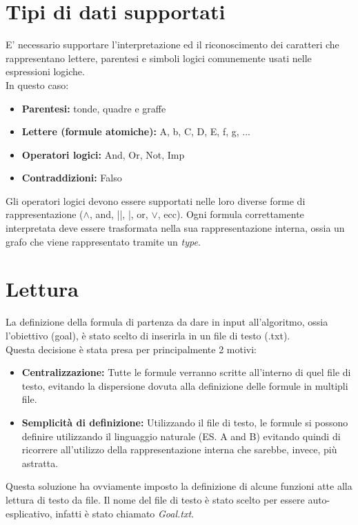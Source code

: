 \documentclass[\main/tesi.tex]{subfiles}
\begin{document}
\section{Tipi di dati supportati}
E' necessario supportare l'interpretazione ed il riconoscimento dei caratteri che rappresentano lettere, parentesi e simboli logici comunemente usati nelle espressioni logiche. \\
In questo caso:
\begin{itemize}
    \item \textbf{Parentesi:} tonde, quadre e graffe
    \item \textbf{Lettere (formule atomiche):} A, b, C, D, E, f, g, ...
    \item \textbf{Operatori logici:} And, Or, Not, Imp
    \item \textbf{Contraddizioni:} Falso
\end{itemize}
Gli operatori logici devono essere supportati nelle loro diverse forme di rappresentazione (\(\land\), and, ||, |, or, \(\lor\), ecc).
Ogni formula correttamente interpretata deve essere trasformata nella sua rappresentazione interna, ossia un grafo che viene rappresentato tramite un \textit{type}. \\

\section{Lettura}
La definizione della formula di partenza da dare in input all'algoritmo, ossia l'obiettivo (goal), è stato scelto di inserirla in un file di testo (.txt). \\
Questa decisione è stata presa per principalmente 2 motivi:
\begin{itemize}
    \item \textbf{Centralizzazione:} Tutte le formule verranno scritte all'interno di quel file di testo, evitando la dispersione dovuta alla definizione delle formule in multipli file.
    \item \textbf{Semplicità di definizione:} Utilizzando il file di testo, le formule si possono definire utilizzando il linguaggio naturale (ES. A and B) evitando quindi di ricorrere all'utilizzo della rappresentazione interna che sarebbe, invece, più astratta.
\end{itemize}
Questa soluzione ha ovviamente imposto la definizione di alcune funzioni atte alla lettura di testo da file.
Il nome del file di testo è stato scelto per essere auto-esplicativo, infatti è stato chiamato \textit{Goal.txt}. \\
\end{document}

